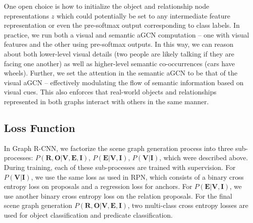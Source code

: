 One open choice is how to initialize the object and relationship node representations $z$ which could potentially be set to any intermediate feature representation or even the pre-softmax output corresponding to class labels. In practice, we run both a visual and semantic aGCN computation -- one with visual features and the other using pre-softmax outputs. In this way, we can reason about both lower-level visual details (\ie two people are likely talking if they are facing one another) as well as higher-level semantic co-occurrences (\ie cars have wheels). Further, we set the attention in the semantic aGCN to be that of the visual aGCN -- effectively modulating the flow of semantic information based on visual cues. This also enforces that real-world objects and relationships represented in both graphs interact with others in the same manner.

\subsection{Loss Function}
In Graph R-CNN, we factorize the scene graph generation process into three sub-processes: $P(\bm{R},\bm{O}|\bm{V}, \bm{E}, \bm{I})$, $P(\bm{E}|\bm{V},\bm{I})$, $P(\bm{V}|\bm{I})$, which were described above. During training, each of these sub-processes are trained with supervision. For $P(\bm{V}|\bm{I})$, we use the same loss as used in RPN, which consists of a binary cross entropy loss on proposals and a regression loss for anchors. For $P(\bm{E}|\bm{V}, \bm{I})$, we use another binary cross entropy loss on the relation proposals. For the final scene graph generation $P(\bm{R},\bm{O}|\bm{V}, \bm{E}, \bm{I})$, two multi-class cross entropy losses are used for object classification and predicate classification.